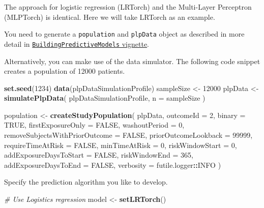 \documentclass[]{article}
\newenvironment{Shaded}{\begin{snugshade}}{\end{snugshade}}
\newcommand{\KeywordTok}[1]{\textcolor[rgb]{0.13,0.29,0.53}{\textbf{#1}}}
\newcommand{\DataTypeTok}[1]{\textcolor[rgb]{0.13,0.29,0.53}{#1}}
\newcommand{\DecValTok}[1]{\textcolor[rgb]{0.00,0.00,0.81}{#1}}
\newcommand{\StringTok}[1]{\textcolor[rgb]{0.31,0.60,0.02}{#1}}
\newcommand{\CommentTok}[1]{\textcolor[rgb]{0.56,0.35,0.01}{\textit{#1}}}
\newcommand{\OtherTok}[1]{\textcolor[rgb]{0.56,0.35,0.01}{#1}}
\newcommand{\OperatorTok}[1]{\textcolor[rgb]{0.81,0.36,0.00}{\textbf{#1}}}
\newcommand{\NormalTok}[1]{#1}
\begin{document}
The approach for logistic regression (LRTorch) and the Multi-Layer
Perceptron (MLPTorch) is identical. Here we will take LRTorch as an
example.

You need to generate a \texttt{population} and \texttt{plpData} object
as described in more detail in
\href{https://github.com/OHDSI/PatientLevelPrediction/blob/master/inst/doc/BuildingPredictiveModels.pdf}{\texttt{BuildingPredictiveModels}
vignette}.

Alternatively, you can make use of the data simulator. The following
code snippet creates a population of 12000 patients.

\begin{Shaded}
\begin{Highlighting}[]
\KeywordTok{set.seed}\NormalTok{(}\DecValTok{1234}\NormalTok{)}
\KeywordTok{data}\NormalTok{(plpDataSimulationProfile)}
\NormalTok{sampleSize <-}\StringTok{ }\DecValTok{12000}
\NormalTok{plpData <-}\StringTok{ }\KeywordTok{simulatePlpData}\NormalTok{(}
\NormalTok{  plpDataSimulationProfile,}
  \DataTypeTok{n =}\NormalTok{ sampleSize}
\NormalTok{)}

\NormalTok{population <-}\StringTok{ }\KeywordTok{createStudyPopulation}\NormalTok{(}
\NormalTok{  plpData,}
  \DataTypeTok{outcomeId =} \DecValTok{2}\NormalTok{,}
  \DataTypeTok{binary =} \OtherTok{TRUE}\NormalTok{,}
  \DataTypeTok{firstExposureOnly =} \OtherTok{FALSE}\NormalTok{,}
  \DataTypeTok{washoutPeriod =} \DecValTok{0}\NormalTok{,}
  \DataTypeTok{removeSubjectsWithPriorOutcome =} \OtherTok{FALSE}\NormalTok{,}
  \DataTypeTok{priorOutcomeLookback =} \DecValTok{99999}\NormalTok{,}
  \DataTypeTok{requireTimeAtRisk =} \OtherTok{FALSE}\NormalTok{,}
  \DataTypeTok{minTimeAtRisk =} \DecValTok{0}\NormalTok{,}
  \DataTypeTok{riskWindowStart =} \DecValTok{0}\NormalTok{,}
  \DataTypeTok{addExposureDaysToStart =} \OtherTok{FALSE}\NormalTok{,}
  \DataTypeTok{riskWindowEnd =} \DecValTok{365}\NormalTok{,}
  \DataTypeTok{addExposureDaysToEnd =} \OtherTok{FALSE}\NormalTok{,}
  \DataTypeTok{verbosity =}\NormalTok{ futile.logger}\OperatorTok{::}\NormalTok{INFO}
\NormalTok{)}
\end{Highlighting}
\end{Shaded}

Specify the prediction algorithm you like to develop.

\begin{Shaded}
\begin{Highlighting}[]
\CommentTok{# Use Logistics regression}
\NormalTok{model <-}\StringTok{ }\KeywordTok{setLRTorch}\NormalTok{()}
\end{Highlighting}
\end{Shaded}
\end{document}
